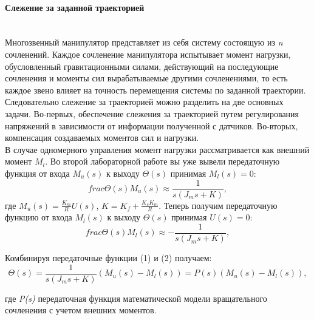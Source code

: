 \paragraph*{Слежение за заданной траекторией}\\
Многозвенный манипулятор представляет из себя систему состоящую из \textit{n} сочленений. Каждое сочленение манипулятора испытывает момент нагрузки, обусловленный гравитационными силами, действующий на последующие сочленения и моменты сил вырабатываемые другими сочленениями, то есть каждое звено влияет на точность перемещения системы по заданной траектории. Следовательно слежение за траекторией можно разделить на две основных задачи. Во-первых, обеспечение слежения за траекторией путем регулирования напряжений в зависимости от информации полученной с датчиков. Во-вторых, компенсация создаваемых моментов сил и нагрузки.\\

В случае одномерного управления момент нагрузки рассматривается как внешний момент $M_l$.
Во второй лабораторной работе вы уже вывели передаточную функция от входа $M_u(s)$ к выходу $ \Theta(s)$ принимая $M_l(s)=0$:\\
\begin{equation}\label{eq:model}
frac{\Theta(s)}{M_u(s)}\approx \frac{1}{s(J_ms+K)},
\end{equation}
где $M_u(s) = \frac{K_m}{R}U(s)$, $K=K_f + \frac{K_eK_m}{R}$. Теперь получим передаточную функцию от входа $M_l(s)$ к выходу $ \Theta(s)$ принимая $U(s)=0$:\\
\begin{equation}\label{eq:model}
frac{\Theta(s)}{M_l(s)}\approx -\frac{1}{s(J_ms+K)},
\end{equation}

Комбинируя передаточные функции (1) и (2) получаем:\\
\begin{equation}\label{eq:model}
\Theta(s) = \frac{1}{s(J_ms + K)}(M_u(s)-M_l(s)) = P(s)(M_u(s) - M_l(s)),
\end{equation}

где \textit{P(s)} передаточная функция математической модели вращательного сочленения с учетом внешних моментов.\\

